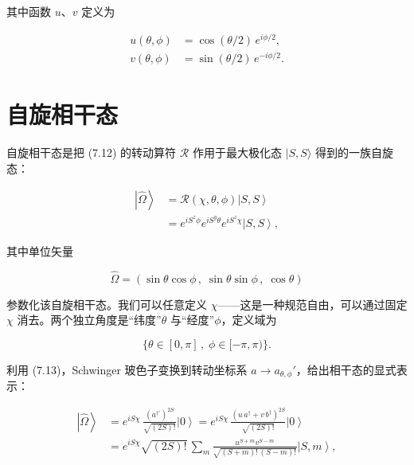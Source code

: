 其中函数 $u$、$v$ 定义为

\begin{align*}
u ( \theta , \phi ) & = \cos ( \theta / 2 ) \, e ^ {i \phi / 2} ,\\
v ( \theta , \phi ) & = \sin ( \theta / 2 ) \, e ^ {- i \phi / 2} .
\tag{7.14}
\end{align*}

\section{自旋相干态}

自旋相干态是把 (7.12) 的转动算符 $\mathcal{R}$ 作用于最大极化态 $|S, S\rangle$ 得到的一族自旋态：

\begin{align*}
\left| \hat {\Omega} \right\rangle & = \mathcal {R} ( \chi , \theta , \phi ) \left| S, S \right\rangle\\
& = e ^ {i S ^ {z} \phi} e ^ {i S ^ {y} \theta} e ^ {i S ^ {z} \chi} \left| S, S \right\rangle ,
\tag{7.15}
\end{align*}

其中单位矢量

\begin{equation*}
\hat {\Omega} = \left( \sin \theta \cos \phi \, , \; \sin \theta \sin \phi \, , \; \cos \theta \right)
\tag{7.16}
\end{equation*}

参数化该自旋相干态。我们可以任意定义 $\chi$——这是一种规范自由，可以通过固定 $\chi$ 消去。两个独立角度是“纬度”$\theta$ 与“经度”$\phi$，定义域为

\begin{equation*}
\{ \theta \in [ 0, \pi ] \, , \; \phi \in [ - \pi , \pi ) \}.
\tag{7.17}
\end{equation*}

利用 (7.13)，Schwinger 玻色子变换到转动坐标系 $a \rightarrow a_{\theta,\phi}'$，给出相干态的显式表示：

\begin{align*}
\left| \hat {\Omega} \right\rangle & = e ^ {i S \chi} \, \frac {\left( a ^ {\dagger '} \right) ^ {2 S}}{\sqrt {( 2 S ) !}} \left| 0 \right\rangle = e ^ {i S \chi} \, \frac {\left( u \, a ^ {\dagger} + v \, b ^ {\dagger} \right) ^ {2 S}}{\sqrt {( 2 S ) !}} \left| 0 \right\rangle\\
& = e ^ {i S \chi} \sqrt {( 2 S ) !} \, \sum_ {m} \frac {u ^ {S + m} v ^ {S - m}}{\sqrt {( S + m ) ! \, ( S - m ) !}} \left| S, m \right\rangle ,
\tag{7.18}
\end{align*}

